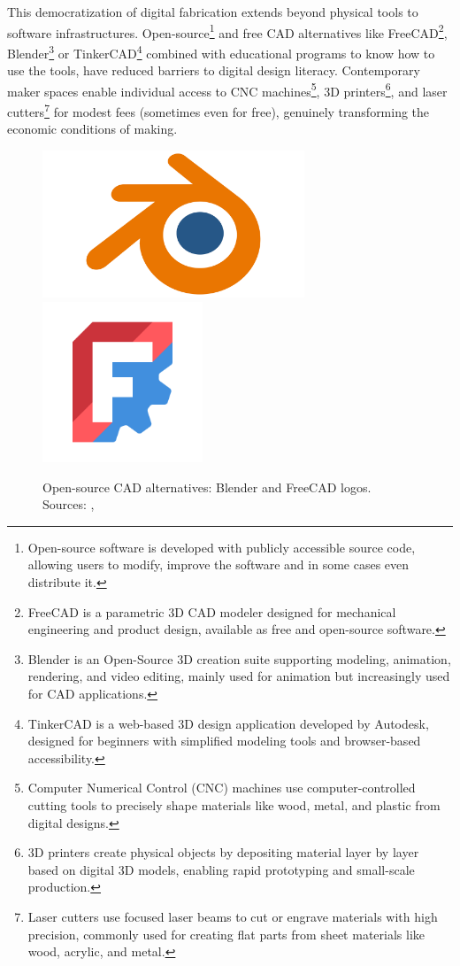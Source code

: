 This democratization of digital fabrication extends beyond physical tools to software infrastructures. Open-source\footnote{Open-source software is developed with publicly accessible source code, allowing users to modify, improve the software and in some cases even distribute it.} and free CAD alternatives like FreeCAD\footnote{FreeCAD is a parametric 3D CAD modeler designed for mechanical engineering and product design, available as free and open-source software.}, Blender\footnote{Blender is an Open-Source 3D creation suite supporting modeling, animation, rendering, and video editing, mainly used for animation but increasingly used for CAD applications.} or TinkerCAD\footnote{TinkerCAD is a web-based 3D design application developed by Autodesk, designed for beginners with simplified modeling tools and browser-based accessibility.} combined with educational programs to know how to use the tools, have reduced barriers to digital design literacy. Contemporary maker spaces enable individual access to CNC machines\footnote{Computer Numerical Control (CNC) machines use computer-controlled cutting tools to precisely shape materials like wood, metal, and plastic from digital designs.}, 3D printers\footnote{3D printers create physical objects by depositing material layer by layer based on digital 3D models, enabling rapid prototyping and small-scale production.}, and laser cutters\footnote{Laser cutters use focused laser beams to cut or engrave materials with high precision, commonly used for creating flat parts from sheet materials like wood, acrylic, and metal.} for modest fees (sometimes even for free), genuinely transforming the economic conditions of making.

\begin{figure}[H]
\centering
\includegraphics[height=4.4cm]{figures/chapter2/Blender.png}
\hspace{1.5cm}
\includegraphics[height=4.8cm]{figures/chapter2/freeCAD.png}
\caption{Open-source CAD alternatives: Blender and FreeCAD logos. Sources: \citet{blender2024}, \citet{freecad2024}}
\label{fig:opensource_cad_logos}
\end{figure}

